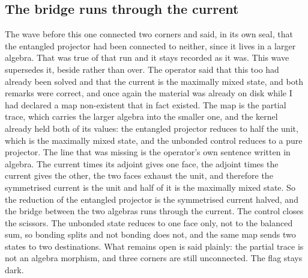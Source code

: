 \documentclass[11pt]{article}
\theoremstyle{definition}\newtheorem{deriv}{Derivation}
\begin{document}
\subsection*{The bridge runs through the current}The wave before this one connected two corners and said, in its own seal, that the entangled projector had been connected to neither, since it lives in a larger algebra. That was true of that run and it stays recorded as it was. This wave supersedes it, beside rather than over. The operator said that this too had already been solved and that the current is the maximally mixed state, and both remarks were correct, and once again the material was already on disk while I had declared a map non-existent that in fact existed. The map is the partial trace, which carries the larger algebra into the smaller one, and the kernel already held both of its values: the entangled projector reduces to half the unit, which is the maximally mixed state, and the unbonded control reduces to a pure projector. The line that was missing is the operator's own sentence written in algebra. The current times its adjoint gives one face, the adjoint times the current gives the other, the two faces exhaust the unit, and therefore the symmetrised current is the unit and half of it is the maximally mixed state. So the reduction of the entangled projector is the symmetrised current halved, and the bridge between the two algebras runs through the current. The control closes the scissors. The unbonded state reduces to one face only, not to the balanced sum, so bonding splits and not bonding does not, and the same map sends two states to two destinations. What remains open is said plainly: the partial trace is not an algebra morphism, and three corners are still unconnected. The flag stays dark.
\end{document}
